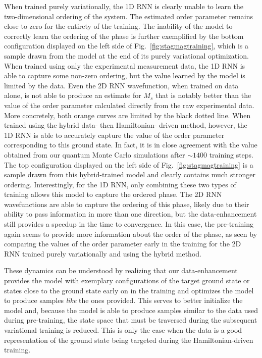 \documentclass[twocolumn,
                showpacs,
                nofootinbib,
                nobibnotes,
                aps,
                superscriptaddress,
                amssymb,
                amsmath,
                floatfix,
                reprint,
                prx, 
                notitlepage,
                showkeys,
                10pt,
		]{revtex4-2}
\begin{document}
When trained purely variationally, the 1D RNN is clearly unable to learn the two-dimensional ordering of the system. The estimated order parameter remains close to zero for the entirety of the training. The inability of the model to correctly learn the ordering of the phase is further exemplified by the bottom configuration displayed on the left side of Fig.~\ref{fig:stagmagtraining}, which is a sample drawn from the model at the end of its purely variational optimization. When trained using only the experimental measurement data, the 1D RNN is able to capture some non-zero ordering, but the value learned by the model is limited by the data. Even the 2D RNN wavefunction, when trained on data alone, is not able to produce an estimate for $M_s$ that is notably better than the value of the order parameter calculated directly from the raw experimental data. More concretely, both orange curves are limited by the black dotted line. When trained using the hybrid data- then Hamiltonian- driven method, however, the 1D RNN is able to accurately capture the value of the order parameter corresponding to this ground state. In fact, it is in close agreement with the value obtained from our quantum Monte Carlo simulations after $\sim 1400$ training steps. The top configuration displayed on the left side of Fig.~\ref{fig:stagmagtraining} is a sample drawn from this hybrid-trained model and clearly contains much stronger ordering. Interestingly, for the 1D RNN, only combining these two types of training allows this model to capture the ordered phase. 
The 2D RNN wavefunctions are able to capture the ordering of this phase, likely due to their ability to pass information in more than one direction, but the data-enhancement still provides a speedup in the time to convergence. In this case, the pre-training again seems to provide more information about the order of the phase, as seen by comparing the values of the order parameter early in the training for the 2D RNN trained purely variationally and using the hybrid method. 

These dynamics can be understood by realizing that our data-enhancement provides the model with exemplary configurations of the target ground state or states close to the ground state early on in the training and optimizes the model to produce samples \emph{like} the ones provided. This serves to better initialize the model and, because the model is able to produce samples similar to the data used during pre-training, the state space that must be traversed during the subsequent variational training is reduced. This is only the case when the data is a good representation of the ground state being targeted during the Hamiltonian-driven training. 
\end{document}
